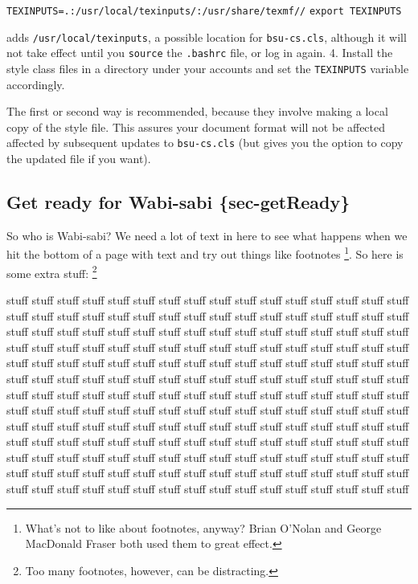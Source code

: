 \documentclass[
  dissertation]{bsu-cs}
\begin{document}
\texttt{TEXINPUTS=.:/usr/local/texinputs/:/usr/share/texmf//}
\texttt{export\ TEXINPUTS}

adds \texttt{/usr/local/texinputs}, a possible location for
\texttt{bsu-cs.cls}, although it will not take effect until you
\texttt{source} the \texttt{.bashrc} file, or log in again. 4. Install
the style class files in a directory under your accounts and set the
\texttt{TEXINPUTS} variable accordingly.

The first or second way is recommended, because they involve making a
local copy of the style file. This assures your document format will not
be affected affected by subsequent updates to \texttt{bsu-cs.cls} (but
gives you the option to copy the updated file if you want).

\subsection{Get ready for Wabi-sabi
\{sec-getReady\}}\label{get-ready-for-wabi-sabi-sec-getready}

So who is Wabi-sabi? We need a lot of text in here to see what happens
when we hit the bottom of a page with text and try out things like
footnotes \footnote{What's not to like about footnotes, anyway? Brian
  O'Nolan and George MacDonald Fraser both used them to great effect.}.
So here is some extra stuff: \footnote{Too many footnotes, however, can
  be distracting.}

stuff stuff stuff stuff stuff stuff stuff stuff stuff stuff stuff stuff
stuff stuff stuff stuff stuff stuff stuff stuff stuff stuff stuff stuff
stuff stuff stuff stuff stuff stuff stuff stuff stuff stuff stuff stuff
stuff stuff stuff stuff stuff stuff stuff stuff stuff stuff stuff stuff
stuff stuff stuff stuff stuff stuff stuff stuff stuff stuff stuff stuff
stuff stuff stuff stuff stuff stuff stuff stuff stuff stuff stuff stuff
stuff stuff stuff stuff stuff stuff stuff stuff stuff stuff stuff stuff
stuff stuff stuff stuff stuff stuff stuff stuff stuff stuff stuff stuff
stuff stuff stuff stuff stuff stuff stuff stuff stuff stuff stuff stuff
stuff stuff stuff stuff stuff stuff stuff stuff stuff stuff stuff stuff
stuff stuff stuff stuff stuff stuff stuff stuff stuff stuff stuff stuff
stuff stuff stuff stuff stuff stuff stuff stuff stuff stuff stuff stuff
stuff stuff stuff stuff stuff stuff stuff stuff stuff stuff stuff stuff
stuff stuff stuff stuff stuff stuff stuff stuff stuff stuff stuff stuff
stuff stuff stuff stuff stuff stuff stuff stuff stuff stuff stuff stuff
stuff stuff stuff stuff stuff stuff stuff stuff stuff stuff stuff stuff
stuff stuff stuff stuff stuff stuff stuff stuff stuff stuff stuff stuff
stuff stuff stuff stuff
\end{document}
